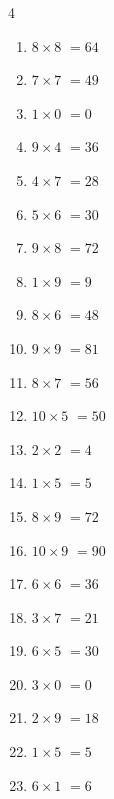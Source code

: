 \begin{multicols}{4}
\begin{enumerate}
  \item $8\times 8$
        $=64$

  \item $7\times 7$
        $=49$

  \item $1\times 0$
        $=0$

  \item $9\times 4$
        $=36$

\columnbreak %

  \item $4\times 7$
        $=28$

  \item $5\times 6$
        $=30$

  \item $9\times 8$
        $=72$

  \item $1\times 9$
        $=9$

  \item $8\times 6$
        $=48$

  \item $9\times 9$
        $=81$

  \item $8\times 7$
        $=56$

  \item $10\times 5$
        $=50$

  \item $2\times 2$
        $=4$

  \item $1\times 5$
        $=5$

  \item $8\times 9$
        $=72$

  \item $10\times 9$
        $=90$

  \item $6\times 6$
        $=36$

  \item $3\times 7$
        $=21$

  \item $6\times 5$
        $=30$

  \item $3\times 0$
        $=0$

  \item $2\times 9$
        $=18$

  \item $1\times 5$
        $=5$

  \item $6\times 1$
        $=6$


\end{enumerate}
\end{multicols}
